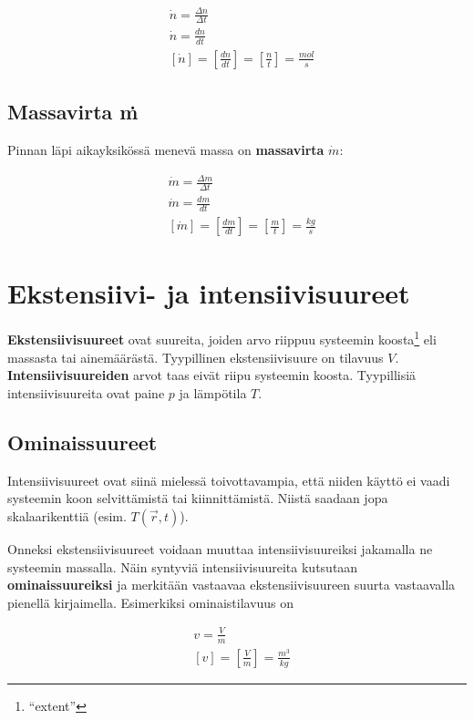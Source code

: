 \documentclass[12pt,a4paper,finnish]{book}
\begin{document}
\begin{align}
 &\dot{n} = \frac{\Delta n}{\Delta t}\\ 
 &\dot{n} = \frac{dn}{dt}\\
 &[\dot{n}] = \left[\frac{dn}{dt}\right] = \left[\frac{n}{t}\right] = \frac{mol}{s}
\end{align}

\subsection{Massavirta \.{m}}

Pinnan läpi aikayksikössä menevä massa on \textbf{massavirta} $\dot{m}$:

\begin{align}
 &\dot{m} = \frac{\Delta m}{\Delta t}\\ 
 &\dot{m} = \frac{dm}{dt}\\
 &[\dot{m}] = \left[\frac{dm}{dt}\right] = \left[\frac{m}{t}\right] = \frac{kg}{s}
\end{align}

\section{Ekstensiivi- ja intensiivisuureet} %

\textbf{Ekstensiivisuureet} ovat suureita, joiden arvo riippuu systeemin koosta\footnote{``extent''} eli 
massasta tai ainemäärästä. Tyypillinen ekstensiivisuure on tilavuus $V$. \textbf{Intensiivisuureiden} arvot 
taas eivät riipu systeemin koosta. Tyypillisiä intensiivisuureita ovat paine $p$ ja lämpötila $T$.

\subsection{Ominaissuureet}

Intensiivisuureet ovat siinä mielessä toivottavampia, että niiden käyttö ei vaadi systeemin koon 
selvittämistä tai kiinnittämistä. Niistä saadaan jopa skalaarikenttiä (esim. $T(\vec{r}, t)$). 

Onneksi 
ekstensiivisuureet voidaan muuttaa intensiivisuureiksi jakamalla ne systeemin massalla. Näin 
syntyviä intensiivisuureita kutsutaan \textbf{ominaissuureiksi} ja merkitään vastaavaa ekstensiivisuureen 
suurta vastaavalla pienellä kirjaimella. Esimerkiksi ominaistilavuus on

\begin{align}
 &v = \frac{V}{m}\\
 &[v] = \left[\frac{V}{m}\right] = \frac{m^3}{kg}
\end{align}
\end{document}
